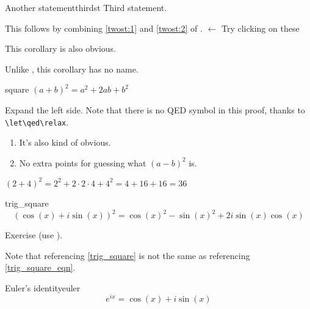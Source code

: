\documentclass[10pt]{extarticle}
\makeatletter
\newcommand{\<}{\langle}
\renewcommand{\>}{\rangle}
\renewenvironment{proof}[1][\proofname] {\par\pushQED{\qed}{\normalfont\sffamily\bfseries\topsep6\p@\@plus6\p@\relax #1\@addpunct{.} }}{\popQED\endtrivlist\@endpefalse}
\theoremstyle{mystyle}{\newtheorem*{remark}{Remark}}
\theoremstyle{mystyle}{\newtheorem*{remarks}{Remarks}}
\theoremstyle{mystyle}{\newtheorem*{example}{Example}}
\theoremstyle{mystyle}{\newtheorem*{examples}{Examples}}
\theoremstyle{definition}{\newtheorem*{exercise}{Exercise}}
\theoremstyle{warn}
\makeatother
\begin{document}
\begin{corollary}{Another statement}{thirdst}
Third statement.
\end{corollary}
\begin{proof}
This follows by combining \ref{twost:1} and \ref{twost:2} of . $\gets$ \scriptsize{\textsf{Try clicking on these}}
\end{proof}
\begin{remark}
This corollary is also obvious.
\end{remark}

\begin{corollary}{}{}
Unlike , this corollary has no name.
\end{corollary}

\begin{lemma}{}{square}
$(a+b)^2=a^2+2ab+b^2$
\end{lemma}
\begin{proof}\let\qed\relax
Expand the left side. Note that there is no QED symbol in this proof, thanks to \verb!\let\qed\relax!.
\end{proof}
\begin{remarks}\leavevmode %
\begin{enumerate}
    \item It's also kind of obvious.
    \item No extra points for guessing what $(a-b)^2$ is.
\end{enumerate}
\end{remarks}

\begin{example}
$(2+4)^2=2^2+2\cdot 2\cdot 4+4^2=4+16+16=36$
\end{example}

\begin{proposition}{}{trig_square}
\begin{equation}\label{trig_square_eqn}
    (\cos(x)+i\sin(x))^2=\cos(x)^2-\sin(x)^2+2i\sin(x)\cos(x)
\end{equation}
\end{proposition}
\begin{proof}
Exercise (use ).
\end{proof}

Note that referencing \cref{trig_square} is not the same as referencing \eqref{trig_square_eqn}.

\begin{lemma}{Euler's identity}{euler}
\begin{equation*}
    e^{ix}=\cos(x)+i\sin(x)
\end{equation*}
\end{lemma}
\end{document}
